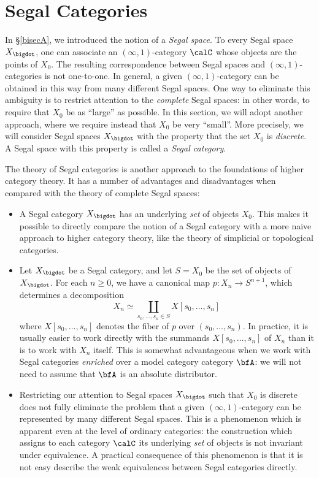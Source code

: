 \section{Segal Categories}\label{bisecB}

In \S \ref{bisecA}, we introduced the notion of a {\it Segal space}. To every
Segal space $X_{\bigdot}$, one can associate an $(\infty,1)$-category
$\calC$ whose objects are the points of $X_0$. The resulting correspondence between
Segal spaces and $(\infty,1)$-categories is not one-to-one. In general, a given
$(\infty,1)$-category can be obtained in this way from many different Segal spaces.
One way to eliminate this ambiguity is to restrict attention to the {\em complete} Segal spaces:
in other words, to require that $X_0$ be as ``large'' as possible. In this section, we will
adopt another approach, where we require instead that $X_0$ be very ``small''. More precisely, we will consider Segal spaces $X_{\bigdot}$ with the property that the set $X_0$ is {\em discrete}. A Segal
space with this property is called a {\it Segal category}. 

The theory of Segal categories is another approach to the foundations of higher category theory.
It has a number of advantages and disadvantages when compared with the theory of
complete Segal spaces:
\begin{itemize}
\item[$(1)$] A Segal category $X_{\bigdot}$ has an underlying {\em set} of objects
$X_0$. This makes it possible to directly compare the notion of a Segal category with a more
naive approach to higher category theory, like the theory of simplicial or topological
categories.
\item[$(2)$] Let $X_{\bigdot}$ be a Segal category, and let $S = X_0$ be the set of objects of $X_{\bigdot}$. For each $n \geq 0$, we have a canonical map $p: X_{n} \rightarrow S^{n+1}$, which
determines a decomposition 
$$ X_{n} \simeq \coprod_{ s_0, \ldots, s_n \in S} X[s_0, \ldots, s_n]$$
where $X[s_0, \ldots, s_n]$ denotes the fiber of $p$ over $(s_0, \ldots, s_n)$.
In practice, it is usually easier to work directly with the summands
$X[ s_0, \ldots, s_n]$ of $X_{n}$ than it is to work with $X_{n}$ itself. This is somewhat
advantageous when we work with Segal categories {\em enriched} over a model category
category $\bfA$: we will not need to assume that $\bfA$ is an absolute distributor.

\item[$(3)$] Restricting our attention to Segal spaces $X_{\bigdot}$ such that $X_0$ is discrete
does not fully eliminate the problem that a given $(\infty,1)$-category can be represented
by many different Segal spaces. This is a phenomenon which is apparent even at the level
of ordinary categories: the construction which assigns to each category $\calC$ its underlying
{\em set} of objects is not invariant under equivalence. A practical consequence of this phenomenon is that it is not easy describe the weak equivalences between Segal categories directly.
\end{itemize}

